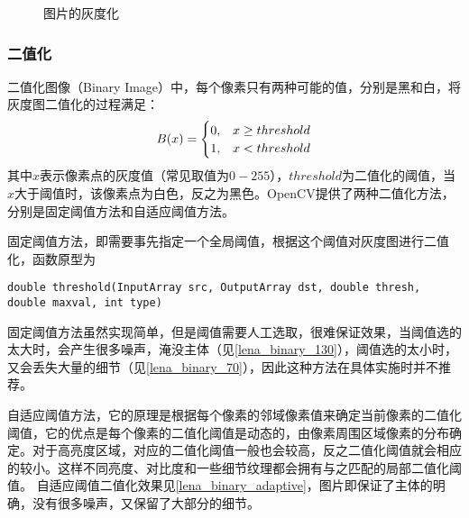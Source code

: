 \begin{figure}[htbp]
  \centering
	\hfill
  \caption{图片的灰度化}
  \label{pic:greyscale}
\end{figure}

\subsubsection*{二值化}
\label{sub:二值化}
二值化图像（Binary Image）中，每个像素只有两种可能的值，分别是黑和白，将灰度图二值化的过程满足\label{pic:binarization}：
\begin{equation} \label{pic:binarization}
	B(x)=
	\begin{cases}
		0,&x\geq threshold\cr 1,&x<threshold
	\end{cases}
\end{equation}
其中$x$表示像素点的灰度值（常见取值为$0-255$），$threshold$为二值化的阈值，当$x$大于阈值时，该像素点为白色，反之为黑色。OpenCV提供了两种二值化方法，分别是固定阈值方法和自适应阈值方法。

固定阈值方法，即需要事先指定一个全局阈值，根据这个阈值对灰度图进行二值化，函数原型为
\begin{lstlisting}
double threshold(InputArray src, OutputArray dst, double thresh, double maxval, int type)
\end{lstlisting}
固定阈值方法虽然实现简单，但是阈值需要人工选取，很难保证效果，当阈值选的太大时，会产生很多噪声，淹没主体（见\autoref{lena_binary_130}），阈值选的太小时，又会丢失大量的细节（见\autoref{lena_binary_70}），因此这种方法在具体实施时并不推荐。

自适应阈值方法，它的原理是根据每个像素的邻域像素值来确定当前像素的二值化阈值，它的优点是每个像素的二值化阈值是动态的，由像素周围区域像素的分布确定。对于高亮度区域，对应的二值化阈值一般也会较高，反之二值化阈值就会相应的较小。这样不同亮度、对比度和一些细节纹理都会拥有与之匹配的局部二值化阈值\citep{binarization}。
自适应阈值二值化效果见\autoref{lena_binary_adaptive}，图片即保证了主体的明确，没有很多噪声，又保留了大部分的细节。

